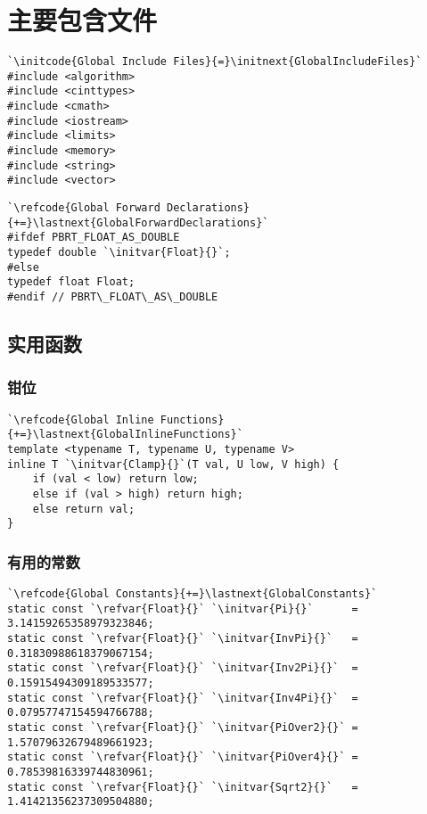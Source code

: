 \section{主要包含文件}\label{sec:主要包含文件}
\begin{lstlisting}
`\initcode{Global Include Files}{=}\initnext{GlobalIncludeFiles}`
#include <algorithm>
#include <cinttypes>
#include <cmath>
#include <iostream>
#include <limits>
#include <memory>
#include <string>
#include <vector>
\end{lstlisting}

\begin{lstlisting}
`\refcode{Global Forward Declarations}{+=}\lastnext{GlobalForwardDeclarations}`
#ifdef PBRT_FLOAT_AS_DOUBLE
typedef double `\initvar{Float}{}`;
#else
typedef float Float;
#endif // PBRT\_FLOAT\_AS\_DOUBLE
\end{lstlisting}

\subsection{实用函数}\label{sub:实用函数}
\subsubsection*{钳位}
\begin{lstlisting}
`\refcode{Global Inline Functions}{+=}\lastnext{GlobalInlineFunctions}`
template <typename T, typename U, typename V>
inline T `\initvar{Clamp}{}`(T val, U low, V high) {
    if (val < low) return low;
    else if (val > high) return high;
    else return val;
}
\end{lstlisting}

\subsubsection*{有用的常数}
\begin{lstlisting}
`\refcode{Global Constants}{+=}\lastnext{GlobalConstants}`
static const `\refvar{Float}{}` `\initvar{Pi}{}`      = 3.14159265358979323846;
static const `\refvar{Float}{}` `\initvar{InvPi}{}`   = 0.31830988618379067154;
static const `\refvar{Float}{}` `\initvar{Inv2Pi}{}`  = 0.15915494309189533577;
static const `\refvar{Float}{}` `\initvar{Inv4Pi}{}`  = 0.07957747154594766788;
static const `\refvar{Float}{}` `\initvar{PiOver2}{}` = 1.57079632679489661923;
static const `\refvar{Float}{}` `\initvar{PiOver4}{}` = 0.78539816339744830961;
static const `\refvar{Float}{}` `\initvar{Sqrt2}{}`   = 1.41421356237309504880;
\end{lstlisting}
